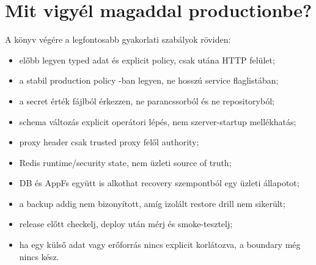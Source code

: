 \section{Mit vigyél magaddal productionbe?}

A könyv végére a legfontosabb gyakorlati szabályok röviden:

\begin{itemize}
  \item előbb legyen typed adat és explicit policy, csak utána HTTP felület;
  \item a stabil production policy -ban legyen, ne hosszú service flaglistában;
  \item a secret érték fájlból érkezzen, ne parancssorból és ne repositoryból;
  \item schema változás explicit operátori lépés, nem szerver-startup mellékhatás;
  \item proxy header csak trusted proxy felől authority;
  \item Redis runtime/security state, nem üzleti source of truth;
  \item DB és AppFs együtt is alkothat recovery szempontból egy üzleti állapotot;
  \item a backup addig nem bizonyított, amíg izolált restore drill nem sikerült;
  \item release előtt checkelj, deploy után mérj és smoke-tesztelj;
  \item ha egy külső adat vagy erőforrás nincs explicit korlátozva, a boundary még nincs kész.
\end{itemize}
